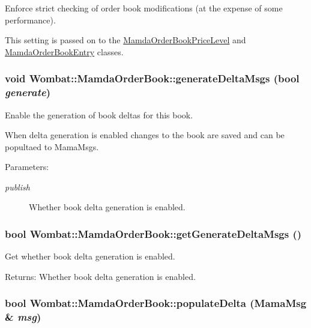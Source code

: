 Enforce strict checking of order book modifications (at the expense of some performance). 

This setting is passed on to the \hyperlink{classWombat_1_1MamdaOrderBookPriceLevel}{Mamda\-Order\-Book\-Price\-Level} and \hyperlink{classWombat_1_1MamdaOrderBookEntry}{Mamda\-Order\-Book\-Entry} classes. \hypertarget{classWombat_1_1MamdaOrderBook_ea8696a68ae878e16263cec2f4076587}{
\subsubsection[generateDeltaMsgs]{\setlength{\rightskip}{0pt plus 5cm}void Wombat::Mamda\-Order\-Book::generate\-Delta\-Msgs (bool {\em generate})}}
\label{classWombat_1_1MamdaOrderBook_ea8696a68ae878e16263cec2f4076587}


Enable the generation of book deltas for this book. 

When delta generation is enabled changes to the book are saved and can be popultaed to Mama\-Msgs. \begin{Desc}
\item[Parameters:]
\begin{description}
\item[{\em publish}]Whether book delta generation is enabled. \end{description}
\end{Desc}
\hypertarget{classWombat_1_1MamdaOrderBook_5d6ece340bb0b0e8586122c094bdd9cc}{
\subsubsection[getGenerateDeltaMsgs]{\setlength{\rightskip}{0pt plus 5cm}bool Wombat::Mamda\-Order\-Book::get\-Generate\-Delta\-Msgs ()}}
\label{classWombat_1_1MamdaOrderBook_5d6ece340bb0b0e8586122c094bdd9cc}


Get whether book delta generation is enabled. 

\begin{Desc}
\item[Returns:]Whether book delta generation is enabled. \end{Desc}
\hypertarget{classWombat_1_1MamdaOrderBook_1b4350eadb899786bdb744a329f4b2b4}{
\subsubsection[populateDelta]{\setlength{\rightskip}{0pt plus 5cm}bool Wombat::Mamda\-Order\-Book::populate\-Delta (Mama\-Msg \& {\em msg})}}
\label{classWombat_1_1MamdaOrderBook_1b4350eadb899786bdb744a329f4b2b4}



